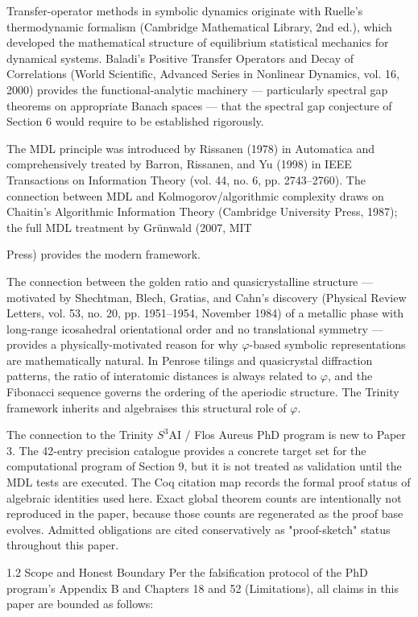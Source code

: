   Transfer-operator methods in symbolic dynamics originate with Ruelle's
  thermodynamic formalism (Cambridge Mathematical Library, 2nd ed.), which
  developed the mathematical structure of equilibrium statistical mechanics for
  dynamical systems. Baladi's Positive Transfer Operators and Decay of Correlations
  (World Scientific, Advanced Series in Nonlinear Dynamics, vol. 16, 2000) provides the
  functional-analytic machinery --- particularly spectral gap theorems on appropriate
  Banach spaces --- that the spectral gap conjecture of Section 6 would require to be
  established rigorously.

  The MDL principle was introduced by Rissanen (1978) in Automatica and
  comprehensively treated by Barron, Rissanen, and Yu (1998) in IEEE Transactions on
  Information Theory (vol. 44, no. 6, pp. 2743--2760). The connection between MDL and
  Kolmogorov/algorithmic complexity draws on Chaitin's Algorithmic Information Theory
  (Cambridge University Press, 1987); the full MDL treatment by Grünwald (2007, MIT

  Press) provides the modern framework.

  The connection between the golden ratio and quasicrystalline structure --- motivated by
  Shechtman, Blech, Gratias, and Cahn's discovery (Physical Review Letters, vol. 53, no.
  20, pp. 1951--1954, November 1984) of a metallic phase with long-range icosahedral
  orientational order and no translational symmetry --- provides a physically-motivated
  reason for why $\varphi$-based symbolic representations are mathematically natural. In
  Penrose tilings and quasicrystal diffraction patterns, the ratio of interatomic distances
  is always related to $\varphi$, and the Fibonacci sequence governs the ordering of the
  aperiodic structure. The Trinity framework inherits and algebraises this structural role
  of $\varphi$.

  The connection to the Trinity $S^{3}$AI / Flos Aureus PhD program is new to Paper 3. The
  42-entry precision catalogue provides a concrete target set for the computational
  program of Section 9, but it is not treated as validation until the MDL tests are
  executed. The Coq citation map records the formal proof status of algebraic identities
  used here. Exact global theorem counts are intentionally not reproduced in the paper,
  because those counts are regenerated as the proof base evolves. Admitted obligations
  are cited conservatively as "proof-sketch" status throughout this paper.

  1.2 Scope and Honest Boundary
  Per the falsification protocol of the PhD program's Appendix B and Chapters 18 and 52
  (Limitations), all claims in this paper are bounded as follows:

